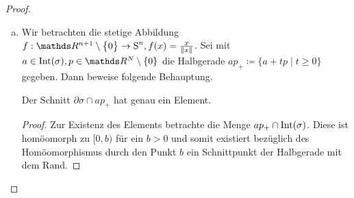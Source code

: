 \begin{Satz}
\begin{proof}
\begin{enumerate}[(a):]

      \item Wir betrachten die stetige Abbildung
        $f : \R^{n+1} \setminus \sset{0} \rightarrow \Sp^{n}, f(x) =
        \frac{x}{\nn[x]}$.
        Sei mit $a \in \Int(\sigma), p \in \R^N \setminus \{ 0 \}$ die
        Halbgerade
        $ap_+ \coloneqq \bigl\{ a + tp \; | \; t \geq 0 \bigr\}$
        gegeben. Dann beweise folgende Behauptung.
      \begin{Beh}
        Der Schnitt $\partial\sigma \cap ap_+$ hat genau ein Element.
        \begin{proof}
          Zur Existenz des Elements betrachte die Menge
          $ap_+ \cap \operatorname{Int}(\sigma)$.  Diese ist homöomorph zu $[0,b)$
          für ein $b>0$ und somit existiert bezüglich des
          Homöomorphismus durch den Punkt $b$ ein Schnittpunkt der
          Halbgerade mit dem Rand.
          

\end{proof}
\end{Beh}
\end{enumerate}
\end{proof}
\end{Satz}
